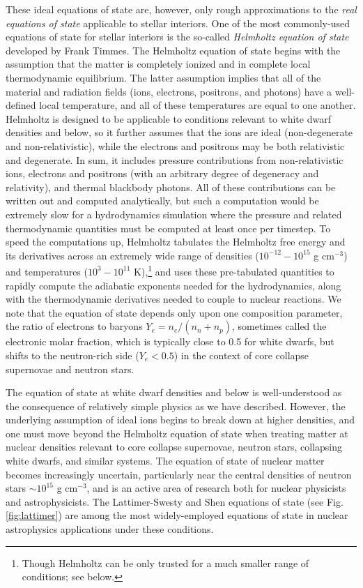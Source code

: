 \documentclass[notoc]{tufte-handout}
\begin{document}
These ideal equations of state are, however, only rough approximations to the {\it real equations of state} applicable to stellar interiors. One of the most commonly-used equations of state for stellar interiors is the so-called {\it Helmholtz equation of state} developed by Frank Timmes. The Helmholtz equation of state begins with the assumption that the matter is completely ionized and in complete local thermodynamic equilibrium. The latter assumption implies that all of the material and radiation fields (ions, electrons, positrons, and photons) have a well-defined local temperature, and all of these temperatures are equal to one another.  Helmholtz is designed to be applicable to conditions relevant to white dwarf densities and below, so it further assumes that the ions are ideal (non-degenerate and non-relativistic), while the electrons and positrons may be both relativistic and degenerate. In sum, it includes pressure contributions from non-relativistic ions, electrons and positrons (with an arbitrary degree of degeneracy and relativity), and thermal blackbody photons. All of these contributions can be written out and computed analytically, but such a computation would be extremely slow for a hydrodynamics simulation where the pressure and related thermodynamic quantities must be computed at least once per timestep. To speed the computations up, Helmholtz tabulates the Helmholtz free energy and its derivatives across an extremely wide range of densities ($10^{-12} - 10^{15}$ g cm$^{-3}$) and temperatures ($10^3 - 10^{11}$ K),\footnote {Though Helmholtz can be only trusted for a much smaller range of conditions; see below.} and uses these pre-tabulated quantities to rapidly compute the adiabatic exponents needed for the hydrodynamics, along with the thermodynamic derivatives needed to couple to nuclear reactions. We note that the equation of state depends only upon one composition parameter, the ratio of electrons to baryons $Y_e = n_e / (n_n + n_p)$, sometimes called the electronic molar fraction, which is typically close to 0.5 for white dwarfs, but shifts to the neutron-rich side ($Y_e < 0.5$) in the context of core collapse supernovae and neutron stars.

The equation of state at white dwarf densities and below is well-understood as the consequence of relatively simple physics as we have described. However, the underlying assumption of ideal ions begins to break down at higher densities, and one must move beyond the Helmholtz equation of state when treating matter at nuclear densities relevant to core collapse supernovae, neutron stars, collapsing white dwarfs, and similar systems.  The equation of state of nuclear matter becomes increasingly uncertain, particularly near the central densities of neutron stars $\sim 10^{15}$ g cm$^{-3}$, and is an active area of research both for nuclear physicists and astrophysicists. The Lattimer-Swesty and Shen equations of state (see Fig. \ref {fig:lattimer}) are among the most widely-employed equations of state in nuclear astrophysics applications under these conditions.
\end{document}
